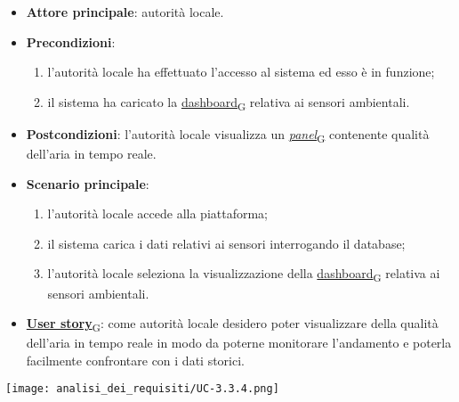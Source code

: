 \begin{itemize}
	\item \textbf{Attore principale}: autorità locale.
	\item \textbf{Precondizioni}:
	      \begin{enumerate}
		      \item l'autorità locale ha effettuato l'accesso al sistema ed esso è in funzione;
		      \item il sistema ha caricato la \href{https://7last.github.io/docs/pb/documentazione-interna/glossario\#dashboard}{dashboard\textsubscript{G}} relativa ai sensori ambientali.
	      \end{enumerate}
	\item \textbf{Postcondizioni}: l'autorità locale visualizza un \href{https://7last.github.io/docs/pb/documentazione-interna/glossario\#panel}{\textit{panel}\textsubscript{G}} contenente qualità dell'aria in tempo reale.
	\item \textbf{Scenario principale}:
	      \begin{enumerate}
		      \item l'autorità locale accede alla piattaforma;
		      \item il sistema carica i dati relativi ai sensori interrogando il database;
		      \item l'autorità locale seleziona la visualizzazione della \href{https://7last.github.io/docs/pb/documentazione-interna/glossario\#dashboard}{dashboard\textsubscript{G}} relativa ai sensori ambientali.
	      \end{enumerate}
	\item \href{https://7last.github.io/docs/pb/documentazione-interna/glossario\#user-story}{\textbf{User story}\textsubscript{G}}:
	      come autorità locale desidero poter visualizzare della qualità dell'aria in tempo reale in modo da poterne monitorare l'andamento
	      e poterla facilmente confrontare con i dati storici.
\end{itemize}
\begin{center}
	\texttt{[image: analisi\_dei\_requisiti/UC-3.3.4.png]}
\end{center}

